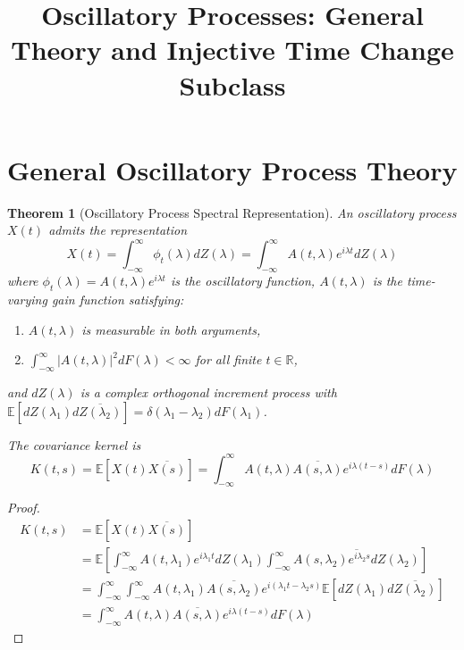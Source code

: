 \documentclass{article}
\title{Oscillatory Processes: General Theory and Injective Time Change Subclass}
\author{}
\date{}
\newtheorem{theorem}{Theorem}
\newtheorem{proof}{Proof}
\begin{document}
\maketitle

\section{General Oscillatory Process Theory}

\begin{theorem}[Oscillatory Process Spectral Representation]\label{thm:spectral}
An oscillatory process $X(t)$ admits the representation
\[
X(t) = \int_{-\infty}^{\infty} \phi_t(\lambda) dZ(\lambda) = \int_{-\infty}^{\infty} A(t,\lambda) e^{i\lambda t} dZ(\lambda)
\]
where $\phi_t(\lambda) = A(t,\lambda) e^{i\lambda t}$ is the oscillatory function, $A(t,\lambda)$ is the time-varying gain function satisfying:
\begin{enumerate}
\item \label{cond:measurable} $A(t,\lambda)$ is measurable in both arguments,
\item \label{cond:L2} $\int_{-\infty}^{\infty} |A(t,\lambda)|^2 dF(\lambda) < \infty$ for all finite $t \in \mathbb{R}$,
\end{enumerate}
and $dZ(\lambda)$ is a complex orthogonal increment process with $\mathbb{E}[dZ(\lambda_1) d\overline{Z(\lambda_2)}] = \delta(\lambda_1 - \lambda_2) dF(\lambda_1)$.

The covariance kernel is
\[
K(t,s) = \mathbb{E}[X(t)\overline{X(s)}] = \int_{-\infty}^{\infty} A(t,\lambda) \overline{A(s,\lambda)} e^{i\lambda(t-s)} dF(\lambda)
\]
\end{theorem}

\begin{proof}
\begin{align}
K(t,s) &= \mathbb{E}[X(t)\overline{X(s)}] \\
&= \mathbb{E}\left[\int_{-\infty}^{\infty} A(t,\lambda_1) e^{i\lambda_1 t} dZ(\lambda_1) \int_{-\infty}^{\infty} \overline{A(s,\lambda_2) e^{i\lambda_2 s} dZ(\lambda_2)}\right] \\
&= \int_{-\infty}^{\infty} \int_{-\infty}^{\infty} A(t,\lambda_1) \overline{A(s,\lambda_2)} e^{i(\lambda_1 t - \lambda_2 s)} \mathbb{E}[dZ(\lambda_1) d\overline{Z(\lambda_2)}] \\
&= \int_{-\infty}^{\infty} A(t,\lambda) \overline{A(s,\lambda)} e^{i\lambda(t-s)} dF(\lambda)
\end{align}
\end{proof}
\end{document}
